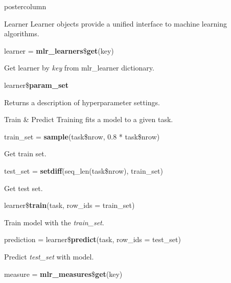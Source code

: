 \documentclass{beamer}
\newlength{\columnheight} %
\begin{document}
\begin{frame}[fragile]{}
\begin{columns}
\begin{column}{.245\textwidth}
\begin{beamercolorbox}[center]{postercolumn}
			\begin{minipage}{.98\textwidth}
				\parbox[t][\columnheight]{\textwidth}{
					\begin{myblock}{Learner}
						Learner objects provide a unified interface to machine learning algorithms.
						\\
						\begin{codebox}
							learner = \textbf{mlr\_learners}\$\textbf{get}(key)
						\end{codebox}
						\hspace*{1ex}Get learner by \textit{key} from mlr\_learner dictionary.
						\\
						\begin{codebox}
							learner\$\textbf{param\_set}
						\end{codebox}
						\hspace*{1ex}Returns a description of hyperparameter settings.
					\end{myblock}
				\begin{myblock}{Train \& Predict}
					Training fits a model to a given task. 
					\\
					\begin{codebox}
						train\_set = \textbf{sample}(task\$nrow, 0.8 * task\$nrow)
					\end{codebox}
					\hspace*{1ex}Get train set.
					\\
					\begin{codebox}
						test\_set = \textbf{setdiff}(seq\_len(task\$nrow), train\_set)
					\end{codebox}
					\hspace*{1ex}Get test set.
					\\
					\begin{codebox}
						learner\$\textbf{train}(task, row\_ids = train\_set)
					\end{codebox}
					\hspace*{1ex}Train model with the \textit{train\_set}.
					\\
					\begin{codebox}
						prediction = learner\$\textbf{predict}(task, row\_ids = test\_set)
					\end{codebox}
					\hspace*{1ex}Predict \textit{test\_set} with model.
					\\
					\begin{codebox}
						measure = \textbf{mlr\_measures}\$\textbf{get}(key)
					\end{codebox}

\end{myblock}}
\end{minipage}
\end{beamercolorbox}
\end{column}
\end{columns}
\end{frame}
\end{document}
